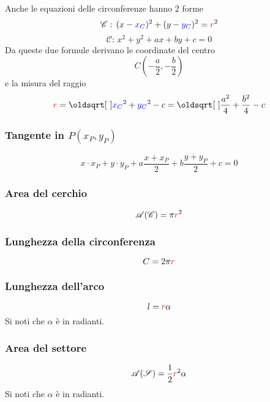 Anche le equazioni delle circonferenze hanno 2 forme
\begin{equation*}
\mathscr{C}:\,(x-\mathcolor{blue}{x_C})^2 + (y-\mathcolor{blue}{y_C})^2 = \mathcolor{red}{r}^2
\end{equation*}
\begin{equation*}
\mathscr{C}:\,x^2+y^2+ax+by+c =0
\end{equation*}
Da queste due formule derivano le coordinate del centro
\begin{equation*}
C\left(-\frac{a}{2},-\frac{b}{2}\right)
\end{equation*}
e la misura del raggio
\begin{equation*}
\mathcolor{red}{r} = \sqrt{\mathcolor{blue}{x_C}^2+\mathcolor{blue}{y_C}^2-c} = 
\sqrt{\frac{a^2}{4}+\frac{b^2}{4}-c}
\end{equation*}

\subsubsection{Tangente in $P(x_P,y_P)$}
\begin{equation*}
x\cdot x_P+y\cdot y_P+a\frac{x+x_P}{2}+b\frac{y+y_P}{2}+c = 0
\end{equation*}

\subsubsection{Area del cerchio}
\begin{equation*}
\mathscr{A}(\mathscr{C}) = \pi\mathcolor{red}{r}^2
\end{equation*}

\subsubsection{Lunghezza della circonferenza}
\begin{equation*}
C = 2\pi\mathcolor{red}{r}
\end{equation*}

\subsubsection{Lunghezza dell'arco}
\begin{equation*}
l = \mathcolor{red}{r}\alpha
\end{equation*}
Si noti che $\alpha$ è in radianti.

\subsubsection{Area del settore}
\begin{equation*}
\mathscr{A}(\mathscr{S}) = \frac{1}{2}\mathcolor{red}{r}^2\alpha
\end{equation*}
Si noti che $\alpha$ è in radianti.

